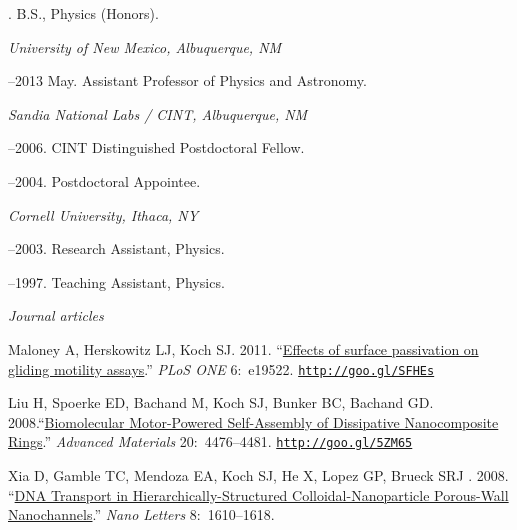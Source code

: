 \documentclass[11pt]{article}
\begin{document}
. B.S., Physics (Honors). \vspace{0.01in}

\bigskip

\medskip
{}

\noindent\emph{University of New Mexico, Albuquerque, NM \vspace{0.01in}}

–2013 May. Assistant Professor of Physics and Astronomy.      

\medskip
\noindent\emph{Sandia National Labs / CINT, Albuquerque, NM \vspace{0.01in}}

–2006. CINT Distinguished Postdoctoral Fellow.

–2004. Postdoctoral Appointee.

\medskip

\noindent\emph{Cornell University, Ithaca, NY \vspace{0.01in}}

–2003. Research Assistant, Physics.

–1997. Teaching Assistant, Physics.

\bigskip

 
\medskip
\noindent\emph{Journal articles \vspace{0.05in}}
 

\ind Maloney A, Herskowitz LJ, Koch SJ. 2011. ``\href{http://goo.gl/SFHEs}{Effects of surface passivation on gliding motility assays}.'' \emph{PLoS ONE} 6:~e19522. {\scriptsize  \texttt{\href{http://goo.gl/SFHEs}{http://goo.gl/SFHEs}}}


\ind Liu H, Spoerke ED, Bachand M, Koch SJ, Bunker BC, Bachand GD. 2008.\newline ``\href{http://goo.gl/5ZM65}{Biomolecular Motor-Powered Self-Assembly of Dissipative Nanocomposite Rings}.'' \emph{Advanced Materials} 20:~4476–4481. {\scriptsize  \texttt{\href{http://goo.gl/5ZM65}{http://goo.gl/5ZM65}}}


\ind Xia D, Gamble TC, Mendoza EA, Koch SJ, He X, Lopez GP, Brueck SRJ . 2008. ``\href{http://goo.gl/F0RiL}{DNA Transport in Hierarchically-Structured Colloidal-Nanoparticle \newline Porous-Wall Nanochannels}.''
 \emph{Nano Letters} 8:~1610–1618. 
\end{document}
